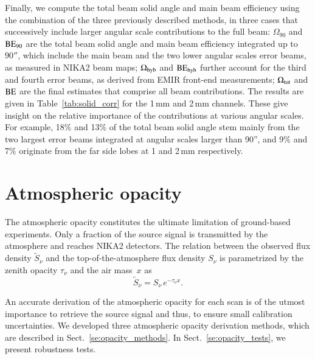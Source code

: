 \documentclass[traditionalabstract]{aa}
\newcommand{\elev}{\rm{el}}
\newcommand{\taunu}{\tau_{\nu}}
\newcommand{\airmass}{air mass}
\newcommand{\rev}[1]{#1}
\begin{document}
{\rev Finally, we compute the total beam solid angle and main beam
efficiency using the combination of the three previously described
methods, in three cases that successively include larger angular scale
contributions to the full beam: $\Omega_{90}$ and $\rm{BE}_{90}$ are
the total beam solid angle and main beam efficiency integrated up to
$90''$, which include the main beam and the two lower angular scales
error beams, as measured in NIKA2 beam maps; $\Omega_{\rm{hyb}}$ and
$\rm{BE}_{\rm{hyb}}$ further account for the third and fourth error
beams, as derived from EMIR front-end measurements; $\Omega_{\rm{tot}}$
and $\rm{BE}$ are the final estimates that comprise all beam
contributions. The results are given in Table~\ref{tab:solid_corr} for
the 1\,mm and 2\,mm channels. These give insight on the relative
importance of the contributions at various angular scales. For
example, 18$\%$ and 13$\%$ of the total beam solid angle stem mainly
from the two largest error beams integrated at angular
scales larger than 90'', and 9$\%$ and 7$\%$ originate from the far
side lobes at 1 and 2\,mm respectively.}


\section{Atmospheric opacity}
\label{se:opacity}
%

The atmospheric opacity constitutes the ultimate limitation of
ground-based experiments. Only a fraction of the source 
signal is transmitted by the atmosphere and reaches NIKA2 detectors. 
The relation between the observed flux density
$\tilde{S}_{\nu}$ and the top-of-the-atmosphere flux density $S_{\nu}$
is parametrized by the zenith opacity $\taunu$
and the \airmass\ $x$ as %
\begin{equation}
\tilde{S}_{\nu} = S_{\nu} \, e^{-\taunu  x}.
\label{eq:uncorr_flux}
\end{equation}

An accurate derivation of the atmospheric opacity for each scan is
of the utmost importance to retrieve the source signal and thus, to
ensure small calibration uncertainties.
We developed three atmospheric opacity derivation methods, which are described in
Sect.~\ref{se:opacity_methods}. In Sect.~\ref{se:opacity_tests}, we
present robustness tests.
\end{document}
